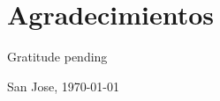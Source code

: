 \chapter*{Agradecimientos}
\thispagestyle{empty}

Gratitude pending

\vspace*{1cm}

\thesisAuthor

San Jose, \today

\cleardoublepage

